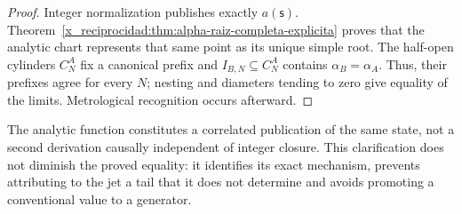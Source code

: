 \begin{proof}
Integer normalization publishes exactly \(a(\mathsf s)\).
Theorem~\ref{x_reciprocidad:thm:alpha-raiz-completa-explicita} proves that the analytic
chart represents that same point as its unique simple root. The
half-open cylinders \(C_N^A\) fix a canonical prefix and
\(I_{B,N}\subseteq C_N^A\) contains \(\alpha_B=\alpha_A\). Thus, their
prefixes agree for every \(N\); nesting and diameters tending to
zero give equality of the limits. Metrological
recognition occurs afterward.
\end{proof}

The analytic function constitutes a correlated publication of the same
state, not a second derivation causally independent of integer
closure. This clarification does not diminish the proved equality: it identifies its
exact mechanism, prevents attributing to the jet a tail that it does not determine and avoids
promoting a conventional value to a generator.




